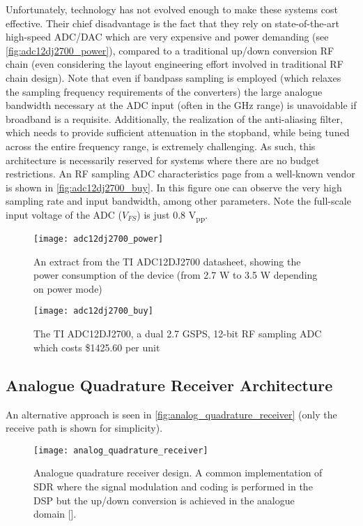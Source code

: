 Unfortunately, technology has not evolved enough to make these systems cost effective. Their chief disadvantage is the fact that they rely on state-of-the-art high-speed ADC/DAC which are very expensive and power demanding (see \autoref{fig:adc12dj2700_power}), compared to a traditional up/down conversion RF chain (even considering the layout engineering effort involved in traditional RF chain design). Note that even if bandpass sampling is employed (which relaxes the sampling frequency requirements of the converters) the large analogue bandwidth necessary at the ADC input (often in the GHz range) is unavoidable if broadband is a requisite. Additionally, the realization of the anti-aliasing filter, which needs to provide sufficient attenuation in the stopband, while being tuned across the entire frequency range, is extremely challenging. As such, this architecture is necessarily reserved for systems where there are no budget restrictions. An RF sampling ADC characteristics page from a well-known vendor is shown in \autoref{fig:adc12dj2700_buy}. In this figure one can observe the very high sampling rate and input bandwidth, among other parameters. Note the full-scale input voltage of the ADC ($V_{FS}$) is just 0.8 V\textsubscript{pp}.

\begin{figure}[H]
  \centering
  \texttt{[image: adc12dj2700\_power]}
  \caption[TI ADC12DJ2700 power consumption]{An extract from the TI ADC12DJ2700 datasheet, showing the power consumption of the device (from 2.7 W to 3.5 W depending on power mode)}
  \label{fig:adc12dj2700_power}
\end{figure}

\begin{figure}[H]
  \centering
  \texttt{[image: adc12dj2700\_buy]}
  \caption[TI ADC12DJ2700 specifications]{The TI ADC12DJ2700, a dual 2.7 GSPS, 12-bit RF sampling ADC which costs \$1425.60 per unit}
  \label{fig:adc12dj2700_buy}
\end{figure}

\subsection{Analogue Quadrature Receiver Architecture}
\label{sect:analogue_quadrature_receiver_architecture}

An alternative approach is seen in \autoref{fig:analog_quadrature_receiver} (only the receive path is shown for simplicity).

\begin{figure}[ht]
  \centering
  \texttt{[image: analog\_quadrature\_receiver]}
  \caption[Analogue quadrature receiver design]{Analogue quadrature receiver design. A common implementation of SDR where the signal modulation and coding is performed in the DSP but the up/down conversion is achieved in the analogue domain [\citeauthor{rf_bb_techniques_sdr}].}
  \label{fig:analog_quadrature_receiver}
\end{figure}

